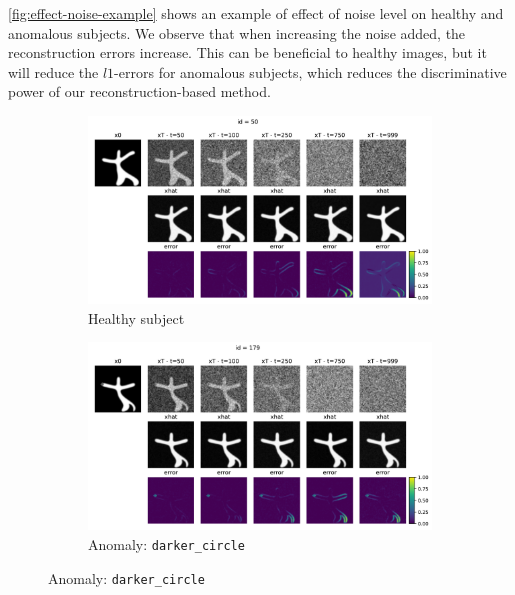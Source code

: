 \cref{fig:effect-noise-example} shows an example of effect of noise level on healthy and anomalous subjects. We observe that when increasing the noise added, the reconstruction errors increase. This can be beneficial to healthy images, but it will reduce the $l1$-errors for anomalous subjects, which reduces the discriminative power of our reconstruction-based method.

\begin{figure}[htbp]
    \centering
    \begin{subfigure}{0.75\linewidth}
        \includegraphics[width=\linewidth]{figures/effect_noise_healthy.pdf}
        \caption{Healthy subject}
    \end{subfigure}

    \begin{subfigure}{0.75\linewidth}
        \includegraphics[width=\linewidth]{figures/effect_noise_darker_circle.pdf}
        \caption{Anomaly: \texttt{darker\_circle}}
    \end{subfigure}


\end{figure}
